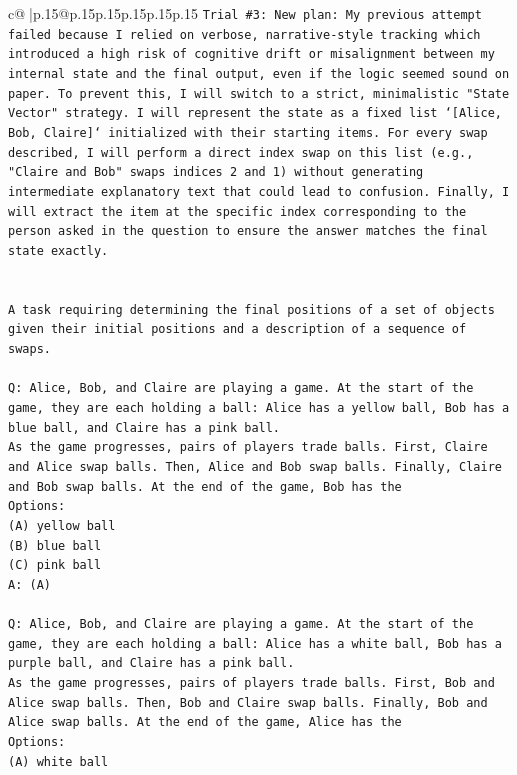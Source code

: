 \documentclass{article}
\begin{document}
{\begin{supertabular}{c@{$\;$}|p{.15\linewidth}@{}p{.15\linewidth}p{.15\linewidth}p{.15\linewidth}p{.15\linewidth}p{.15\linewidth}}
{{{\texttt{Trial \#3: New plan: My previous attempt failed because I relied on verbose, narrative{-}style tracking which introduced a high risk of cognitive drift or misalignment between my internal state and the final output, even if the logic seemed sound on paper. To prevent this, I will switch to a strict, minimalistic "State Vector" strategy. I will represent the state as a fixed list `{[}Alice, Bob, Claire{]}` initialized with their starting items. For every swap described, I will perform a direct index swap on this list (e.g., "Claire and Bob" swaps indices 2 and 1) without generating intermediate explanatory text that could lead to confusion. Finally, I will extract the item at the specific index corresponding to the person asked in the question to ensure the answer matches the final state exactly.} \\
\\ 
\\ 
\texttt{A task requiring determining the final positions of a set of objects given their initial positions and a description of a sequence of swaps.} \\
\\ 
\texttt{Q: Alice, Bob, and Claire are playing a game. At the start of the game, they are each holding a ball: Alice has a yellow ball, Bob has a blue ball, and Claire has a pink ball.} \\
\texttt{As the game progresses, pairs of players trade balls. First, Claire and Alice swap balls. Then, Alice and Bob swap balls. Finally, Claire and Bob swap balls. At the end of the game, Bob has the} \\
\texttt{Options:} \\
\texttt{(A) yellow ball} \\
\texttt{(B) blue ball} \\
\texttt{(C) pink ball} \\
\texttt{A: (A)} \\
\\ 
\texttt{Q: Alice, Bob, and Claire are playing a game. At the start of the game, they are each holding a ball: Alice has a white ball, Bob has a purple ball, and Claire has a pink ball.} \\
\texttt{As the game progresses, pairs of players trade balls. First, Bob and Alice swap balls. Then, Bob and Claire swap balls. Finally, Bob and Alice swap balls. At the end of the game, Alice has the} \\
\texttt{Options:} \\
\texttt{(A) white ball} \\
}}}
\end{supertabular}}
\end{document}
